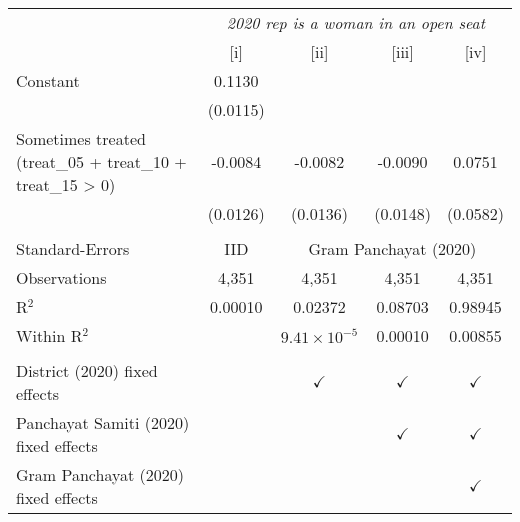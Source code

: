 
\begingroup
\centering
\begin{tabular}{lcccc}
   \toprule
    & \multicolumn{4}{c}{\textit{2020 rep is a woman in an open seat}}\\
                                                                & [i]      & [ii]                  & [iii]         & [iv]\\  
   \midrule 
   Constant                                                     & 0.1130   &                       &               &   \\   
                                                                & (0.0115) &                       &               &   \\   
   Sometimes treated (treat\_05 + treat\_10 + treat\_15 > 0)    & -0.0084  & -0.0082               & -0.0090       & 0.0751\\   
                                                                & (0.0126) & (0.0136)              & (0.0148)      & (0.0582)\\   
    \\
   Standard-Errors & IID & \multicolumn{3}{c}{Gram Panchayat (2020)} \\ 
   Observations                                                 & 4,351    & 4,351                 & 4,351         & 4,351\\  
   R$^2$                                                        & 0.00010  & 0.02372               & 0.08703       & 0.98945\\  
   Within R$^2$                                                 &          & $9.41\times 10^{-5}$  & 0.00010       & 0.00855\\  
    \\
   District (2020) fixed effects                                &          & $\checkmark$          & $\checkmark$  & $\checkmark$\\   
   Panchayat Samiti (2020) fixed effects                        &          &                       & $\checkmark$  & $\checkmark$\\   
   Gram Panchayat (2020) fixed effects                          &          &                       &               & $\checkmark$\\   
   \bottomrule
\end{tabular}
\par\endgroup


